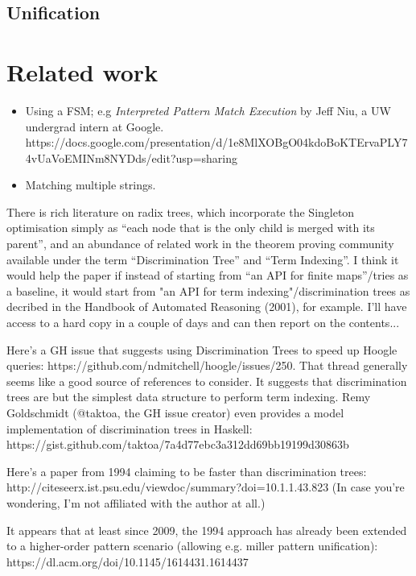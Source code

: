 \documentclass[acmsmall]{acmart}
\theoremstyle{theorem}
\theoremstyle{definition}
\theoremstyle{remark}
\begin{document}

\subsection{Unification}

\section{Related work}

\begin{itemize}
\item Using a FSM; e.g \emph{Interpreted Pattern Match Execution} by Jeff Niu, a UW undergrad intern at Google.  https://docs.google.com/presentation/d/1e8MlXOBgO04kdoBoKTErvaPLY74vUaVoEMINm8NYDds/edit?usp=sharing

\item Matching multiple strings.
\end{itemize}

There is rich literature on radix trees, which incorporate the Singleton optimisation simply as ``each node that is the only child is merged with its parent'', and an abundance of related work in the theorem proving community available under the term ``Discrimination Tree'' and ``Term Indexing''. I think it would help the paper if instead of starting from ``an API for finite maps''/tries as a baseline, it would start from "an API for term indexing"/discrimination trees as decribed in the Handbook of Automated Reasoning (2001), for example. I'll have access to a hard copy in a couple of days and can then report on the contents...

Here's a GH issue that suggests using Discrimination Trees to speed up Hoogle queries: https://github.com/ndmitchell/hoogle/issues/250. That thread generally seems like a good source of references to consider. It suggests that discrimination trees are but the simplest data structure to perform term indexing.
Remy Goldschmidt (@taktoa, the GH issue creator) even provides a model implementation of discrimination trees in Haskell: https://gist.github.com/taktoa/7a4d77ebc3a312dd69bb19199d30863b

Here's a paper from 1994 claiming to be faster than discrimination trees: http://citeseerx.ist.psu.edu/viewdoc/summary?doi=10.1.1.43.823 (In case you're wondering, I'm not affiliated with the author at all.)

It appears that at least since 2009, the 1994 approach has already been extended to a higher-order pattern scenario (allowing e.g. miller pattern unification): https://dl.acm.org/doi/10.1145/1614431.1614437
\end{document}
